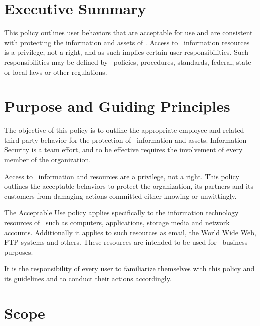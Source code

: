\documentclass[use]{policy}
\begin{document}
	\maketitle
	
	\thispagestyle{plain}
	\titleline
	
	\doctable
	\tableofcontents
	
	\section{Executive Summary}
	
		This policy outlines user behaviors that are acceptable for use and are consistent with protecting the information and assets of \theOrganization.  Access to \theOrganization\ information resources is a privilege, not a right, and as such implies certain user responsibilities. Such responsibilities may be defined by \theOrganization\ policies, procedures, standards, federal, state or local laws or other regulations.
	
	
	\section{Purpose and Guiding Principles}
	
		The objective of this policy is to outline the appropriate employee and related third party behavior for the protection of \theOrganization\ information and assets. Information Security is a team effort, and to be effective requires the involvement of every member of the organization.
	
		Access to \theOrganization\  information and resources are a privilege, not a right.  This policy outlines the acceptable behaviors to protect the organization, its partners and its customers from damaging actions committed either knowing or unwittingly.
	
		The Acceptable Use policy applies specifically to the information technology resources of \theOrganization\  such as computers, applications, storage media and network accounts.  Additionally it applies to such resources as email, the World Wide Web, FTP systems and others.  These resources are intended to be used for \theOrganization\  business purposes.  
		
		It is the responsibility of every user to familiarize themselves with this policy and its guidelines and to conduct their actions accordingly.
		
	
	\section{Scope}
	
\end{document}
